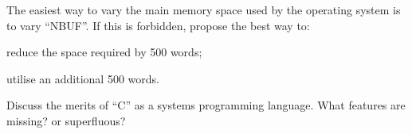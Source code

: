 \bd
\item[6.1] The easiest way to vary the main
memory space used by the operating system is to
vary ``NBUF''. If this is forbidden, propose the best way to:

\bd
\item[(a)] reduce the space required by 500
words;

\item[(b)] utilise an additional 500 words.
\ed

\item[6.2] Discuss the merits of ``C'' as a systems programming language. What
features are missing? or superfluous?
\ed
